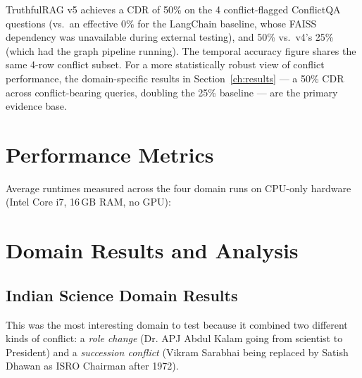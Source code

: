 TruthfulRAG v5 achieves a CDR of 50\% on the 4 conflict-flagged ConflictQA questions
(vs.\ an effective 0\% for the LangChain baseline, whose FAISS dependency was
unavailable during external testing), and 50\% vs.\ v4's 25\% (which had the graph
pipeline running). The temporal accuracy figure shares the same 4-row conflict subset.
For a more statistically robust view of conflict performance, the domain-specific
results in Section~\ref{ch:results} --- a 50\% CDR across conflict-bearing queries,
doubling the 25\% baseline --- are the primary evidence base.

\section{Performance Metrics}

Average runtimes measured across the four domain runs on CPU-only hardware
(Intel Core i7, 16\,GB RAM, no GPU):

\begin{table}[H]
\centering
\caption{Pipeline performance across all four test domains}
\label{tab:perf}
\end{table}

\section{Domain Results and Analysis}

\subsection{Indian Science Domain Results}

This was the most interesting domain to test because it combined two different
kinds of conflict: a \emph{role change} (Dr. APJ Abdul Kalam going from
scientist to President) and a \emph{succession conflict} (Vikram Sarabhai being
replaced by Satish Dhawan as ISRO Chairman after 1972).


